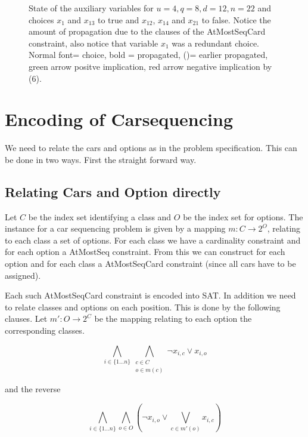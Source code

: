 \documentclass[]{llncs}
\begin{document}
\begin{figure}
\centering 
\caption{State of the auxiliary variables for $u=4,q=8,d=12,n=22$ and
    choices $x_{1}$ and $x_{13}$ to true and $x_{12}$, $x_{14}$ and
    $x_{21}$ to false. Notice the amount of propagation due to the
    clauses of the AtMostSeqCard constraint, also notice that variable
$x_{1}$ was a redundant choice. Normal font= choice, bold = propagated,
()= earlier propagated, green arrow positve implication, red arrow
negative implication by (6).}
%
\end{figure}

\section{Encoding of Carsequencing}

We need to relate the cars and options as in the problem specification.
This can be done in two ways. First the straight forward way. 

\subsection{Relating Cars and Option directly}

Let $C$ be the index set identifying a class and $O$ be the index set
for options. The instance for a car sequencing problem is given by a
mapping $m : C\rightarrow 2^O$, relating to each class a set of options.
For each class we have a cardinality constraint and for each option a
AtMostSeq constraint. From this we can construct for each option and for
each class a AtMostSeqCard constraint (since all cars have to be
assigned). 

Each such AtMostSeqCard constraint is encoded into SAT. In addition we
need to relate classes and options on each position. This is done by the
following clauses.  Let $m':O \rightarrow 2^C$ be the mapping relating
to each option the corresponding classes. 

\begin{equation}
    \bigwedge_{i\in \{1\ldots n\}} \bigwedge_{\substack{c \in C \\ o \in m(c)}} \neg x_{i,c} \vee x_{i,o}
\end{equation}

and the reverse

\begin{equation}
    \bigwedge_{i \in \{1\dots n\}} \bigwedge_{o\in O} \left(\neg x_{i,o} \vee
    \bigvee_{c \in m'(o)} x_{i,c}\right)
\end{equation}
\end{document}
